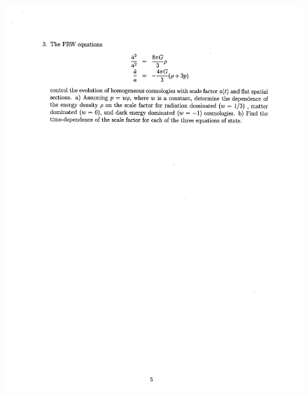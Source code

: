 \documentclass[10pt,a4paper]{article}
\begin{document}
\begin{figure}[H]
 \centering
 \includegraphics[width=16cm]{pdf/1-1T44.png}
\end{figure}
 \newpage
\end{document}
